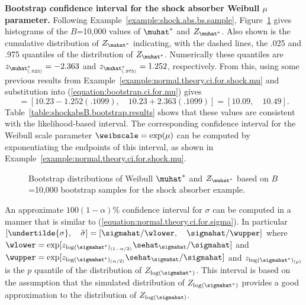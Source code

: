 \begin{example}
{\bf Bootstrap confidence interval for the shock absorber Weibull
$\mu$ parameter.} Following Example~\ref{example:shock.abs.bs.sample},
Figure~\ref{figure:shockabsB.weib.boot.summary.mu.ps} gives histograms
of the $B$=10,000 values of $\muhat^{*}$ and $Z_{\muhat^{*}}$. Also
shown is the cumulative distribution of $Z_{\muhat^{*}}$ indicating,
with the dashed lines, the  .025 and  .975 quantiles of the
distribution of $Z_{\muhat^{*}}$. Numerically
these quantiles are $z_{\muhat^{*}_{(.025)}} =
-2.363$ and $z_{\muhat^{*}_{(.975)}}=1.252$, respectively.  From this,
using some previous results from
Example~\ref{example:normal.theory.ci.for.shock.mu} and substitution
into (\ref{equation:bootstrap.ci.for.mu}) gives
\begin{displaymath}
 [\undertilde{\mu},\quad \tilde{\mu}] =
[10.23 -  1.252 (.1099), \quad 10.23 +  2.363 (.1099)] = 
	[10.09, \quad 10.49].
\end{displaymath}
Table~\ref{table:shockabsB.bootstrap.results} shows that these values
are consistent with the likelihood-based interval.  The corresponding
confidence interval for the Weibull scale parameter
$\weibscale=\exp(\mu)$ can be computed by exponentiating the endpoints
of this interval, as shown in
Example~\ref{example:normal.theory.ci.for.shock.mu}.
\begin{figure}
\caption{Bootstrap distributions of Weibull
$\muhat^{*}$ and $Z_{\muhat^{*}}$
based on $B$=10,000 bootstrap samples for the shock absorber example.}
\label{figure:shockabsB.weib.boot.summary.mu.ps}
\end{figure}
\end{example}

An approximate $100(1-\alpha)\%$ confidence interval for $\sigma$
can be computed in a
manner that is similar to
(\ref{equation:normal.theory.ci.for.sigma}). In particular
$[ \undertilde{\sigma}, \quad \tilde{\sigma}]=
[\sigmahat/\wlower, 
\quad \sigmahat/\wupper]$
where $\wlower=\exp[ z_{\log(\sigmahat^{*})_{(1-\alpha/2)}} 
\sehat_{\sigmahat}/\sigmahat]$ and $\wupper=\exp[ z_{\log(\sigmahat^
{*})_{(\alpha/2)}} \sehat_{\sigmahat}  /\sigmahat]$
and $z_{\log(\sigmahat^{*})_{(p)}}$ is the $p$ quantile of
the distribution of $Z_{\log(\sigmahat^{*})}$. This interval is
based on the assumption that the simulated distribution of
$Z_{\log(\sigmahat^{*})}$ provides a good approximation to the
distribution of $Z_{\log(\sigmahat)}$. 

